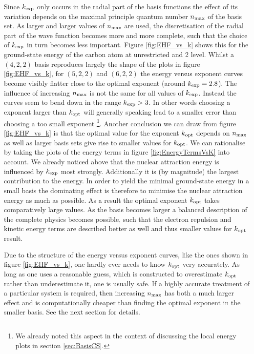 Since $k_\text{exp}$ only occurs in the radial part of the \CS basis functions
the effect of its variation depends on the
maximal principle quantum number $n_\text{max}$ of the basis set.
As larger and larger values of $n_\text{max}$ are used,
the discretisation of the radial part of the wave function
becomes more and more complete,
such that the choice of $k_\text{exp}$ in turn becomes less important.
Figure \vref{fig:EHF_vs_k} shows this for the ground-state energy of the carbon atom
at unrestricted \HF and {\MP}2 level.
Whilst a $(4,2,2)$ \CS basis reproduces largely the
shape of the plots in figure \ref{fig:EHF_vs_k},
for $(5,2,2)$ and $(6,2,2)$ the energy versus exponent curves
become visibly flatter close to the optimal exponent (around $k_\text{exp} = 2.8$).
The influence of increasing $n_\text{max}$ is not the same
for all values of $k_\text{exp}$.
Instead the curves seem to bend down in the range $k_\text{exp} > 3$.
In other words choosing a \CS exponent larger than $k_\text{opt}$
will generally speaking lead to a smaller error
than choosing a too small exponent%
\footnote{We already noted this aspect in the context of discussing
	the local energy plots in section \vref{sec:BasisCS}.}.
Another conclusion we can draw from figure \ref{fig:EHF_vs_k}
is that the optimal value for the exponent $k_\text{opt}$
depends on $n_\text{max}$ as well
as larger basis sets give rise to smaller values for $k_\text{opt}$.
We can rationalise by taking the plots of the energy terms
in figure \vref{fig:EnergyTermsVsK} into account.
We already noticed above that the nuclear attraction energy
is influenced by $k_\text{exp}$ most strongly.
Additionally it is (by magnitude) the largest contribution to the \HF energy.
In order to yield the minimal ground-state energy
in a small basis the dominating effect is therefore to
minimise the nuclear attraction energy as much as possible.
As a result the optimal exponent $k_\text{opt}$ takes comparatively large values.
As the basis becomes larger a balanced description
of the complete physics becomes possible,
such that the electron repulsion and kinetic energy terms
are described better as well
and thus smaller values for $k_\text{opt}$ result.

Due to the structure of the energy versus exponent curves,
like the ones shown in figure \vref{fig:EHF_vs_k},
one hardly ever needs to know $k_\text{opt}$ very accurately.
As long as one uses a reasonable guess,
which is constructed to overestimate $k_\text{opt}$
rather than underestimate it, one is usually safe.
If a highly accurate treatment of a particular system is required,
then increasing $n_\text{max}$ has both a much larger effect
and is computationally cheaper than finding the optimal exponent in the smaller basis.
See the next section for details.

